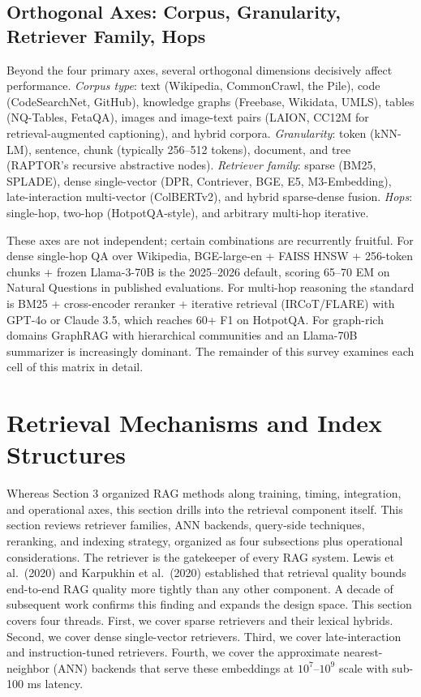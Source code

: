 \documentclass{article}
\begin{document}
\subsection{Orthogonal Axes: Corpus, Granularity, Retriever Family, Hops}\label{orthogonal-axes-corpus-granularity-retriever-family-hops}

Beyond the four primary axes, several orthogonal dimensions decisively affect performance. \emph{Corpus type}: text (Wikipedia, CommonCrawl, the Pile), code (CodeSearchNet, GitHub), knowledge graphs (Freebase, Wikidata, UMLS), tables (NQ-Tables, FetaQA), images and image-text pairs (LAION, CC12M for retrieval-augmented captioning), and hybrid corpora. \emph{Granularity}: token (kNN-LM), sentence, chunk (typically 256--512 tokens), document, and tree (RAPTOR's recursive abstractive nodes). \emph{Retriever family}: sparse (BM25, SPLADE), dense single-vector (DPR, Contriever, BGE, E5, M3-Embedding), late-interaction multi-vector (ColBERTv2), and hybrid sparse-dense fusion. \emph{Hops}: single-hop, two-hop (HotpotQA-style), and arbitrary multi-hop iterative.

These axes are not independent; certain combinations are recurrently fruitful. For dense single-hop QA over Wikipedia, BGE-large-en + FAISS HNSW + 256-token chunks + frozen Llama-3-70B is the 2025--2026 default, scoring 65--70 EM on Natural Questions in published evaluations. For multi-hop reasoning the standard is BM25 + cross-encoder reranker + iterative retrieval (IRCoT/FLARE) with GPT-4o or Claude 3.5, which reaches 60+ F1 on HotpotQA. For graph-rich domains GraphRAG with hierarchical communities and an Llama-70B summarizer is increasingly dominant. The remainder of this survey examines each cell of this matrix in detail.

\section{Retrieval Mechanisms and Index Structures}\label{retrieval-mechanisms-and-index-structures}

Whereas Section 3 organized RAG methods along training, timing, integration, and operational axes, this section drills into the retrieval component itself. This section reviews retriever families, ANN backends, query-side techniques, reranking, and indexing strategy, organized as four subsections plus operational considerations. The retriever is the gatekeeper of every RAG system. Lewis et al.~(2020) and Karpukhin et al.~(2020) established that retrieval quality bounds end-to-end RAG quality more tightly than any other component. A decade of subsequent work confirms this finding and expands the design space. This section covers four threads. First, we cover sparse retrievers and their lexical hybrids. Second, we cover dense single-vector retrievers. Third, we cover late-interaction and instruction-tuned retrievers. Fourth, we cover the approximate nearest-neighbor (ANN) backends that serve these embeddings at \(10^7\)--\(10^9\) scale with sub-100 ms latency.
\end{document}
